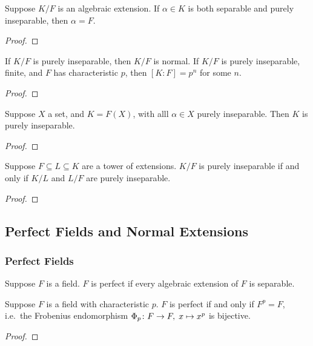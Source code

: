 \begin{theorem}
    Suppose \(K/F\) is an algebraic extension.
    If \(\alpha \in K\) is both separable and purely inseparable,
    then \(\alpha = F\).
\end{theorem}
\begin{proof}
\end{proof}
\begin{theorem}
    If \(K/F\) is purely inseparable, then \(K/F\) is normal.
    If \(K/F\) is purely inseparable, finite, and \(F\) has characteristic \(p\),
    then \([K:F] = p^n\) for some \(n\).
\end{theorem}
\begin{proof}
\end{proof}
\begin{theorem}
    Suppose \(X\) a set, and \(K = F(X)\),
    with alll \(\alpha \in X\) purely inseparable.
    Then \(K\) is purely inseparable.
\end{theorem}
\begin{proof}
\end{proof}
\begin{theorem}
    Suppose \(F \subseteq L \subseteq K\) are a tower of extensions.
    \(K/F\) is purely inseparable if and only if
    \(K/L\) and \(L/F\) are purely inseparable.
\end{theorem}
\begin{proof}
\end{proof}



\subsection{Perfect Fields and Normal Extensions}

\subsubsection*{Perfect Fields}

\begin{definition}
    Suppose \(F\) is a field.
    \(F\) is perfect if every algebraic extension of \(F\) is separable.
\end{definition}
\begin{proposition}
    Suppose \(F\) is a field with characteristic \(p\).
    \(F\) is perfect if and only if \(F^p = F\),
    i.e.\ the Frobenius endomorphism \(\Phi_p\colon F\to F,\;x\mapsto x^p\) is bijective.
\end{proposition}
\begin{proof}
\end{proof}

